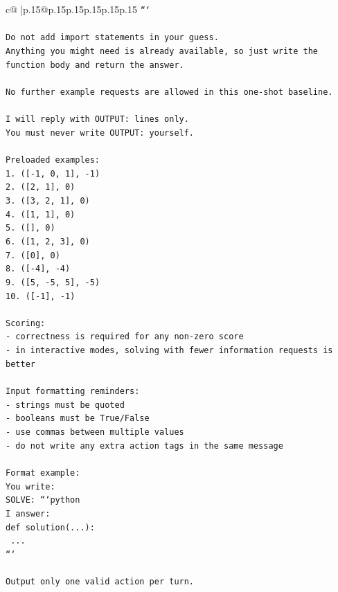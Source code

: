 \documentclass{article}
\begin{document}
{\begin{supertabular}{c@{$\;$}|p{.15\linewidth}@{}p{.15\linewidth}p{.15\linewidth}p{.15\linewidth}p{.15\linewidth}p{.15\linewidth}}
{{{\texttt{```} \\
\\ 
\texttt{Do not add import statements in your guess.} \\
\texttt{Anything you might need is already available, so just write the function body and return the answer.} \\
\\ 
\texttt{No further example requests are allowed in this one{-}shot baseline.} \\
\\ 
\texttt{I will reply with OUTPUT: lines only.} \\
\texttt{You must never write OUTPUT: yourself.} \\
\\ 
\texttt{Preloaded examples:} \\
\texttt{1. ({[}{-}1, 0, 1{]}, {-}1)} \\
\texttt{2. ({[}2, 1{]}, 0)} \\
\texttt{3. ({[}3, 2, 1{]}, 0)} \\
\texttt{4. ({[}1, 1{]}, 0)} \\
\texttt{5. ({[}{]}, 0)} \\
\texttt{6. ({[}1, 2, 3{]}, 0)} \\
\texttt{7. ({[}0{]}, 0)} \\
\texttt{8. ({[}{-}4{]}, {-}4)} \\
\texttt{9. ({[}5, {-}5, 5{]}, {-}5)} \\
\texttt{10. ({[}{-}1{]}, {-}1)} \\
\\ 
\texttt{Scoring:} \\
\texttt{{-} correctness is required for any non{-}zero score} \\
\texttt{{-} in interactive modes, solving with fewer information requests is better} \\
\\ 
\texttt{Input formatting reminders:} \\
\texttt{{-} strings must be quoted} \\
\texttt{{-} booleans must be True/False} \\
\texttt{{-} use commas between multiple values} \\
\texttt{{-} do not write any extra action tags in the same message} \\
\\ 
\texttt{Format example:} \\
\texttt{You write:} \\
\texttt{SOLVE: ```python} \\
\texttt{I answer:} \\
\texttt{def solution(...):} \\
\texttt{    ...} \\
\texttt{```} \\
\\ 
\texttt{Output only one valid action per turn.} \\
            }
        }
    }
     \\ \\


\end{supertabular}}
\end{document}
